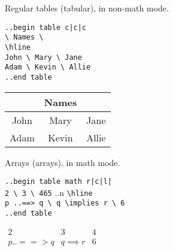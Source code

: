 \documentclass[12pt]{article}
\begin{document}
\begin{flushleft}

Regular tables (tabular), in non-math mode.

\verb=..begin table c|c|c= \\
\verb|\ Names \| \\
\verb|\hline| \\
\verb|John \ Mary \ Jane| \\
\verb|Adam \ Kevin \ Allie| \\
\verb|..end table|

\bigskip
\bigskip

\begin{tabular}{c|c|c}
& Names & \\
\hline
John & Mary & Jane \\
Adam & Kevin & Allie 
\end{tabular}

\bigskip
\bigskip
\bigskip
\bigskip

Arrays (arrays), in math mode.

\verb=..begin table math r|c|l|= \\
\verb|2 \ 3 \ 465| ..n
\verb|\hline| \\
\verb|p |\verb|..==> q \ q \implies r \ 6| \\
\verb|..end table|

\bigskip
\bigskip

$\begin{array}{r|c|l|}
2 & 3 & 4 \\
\hline
p ..==> q & q \implies r & 6 
\end{array}$

\end{flushleft}
\end{document}
